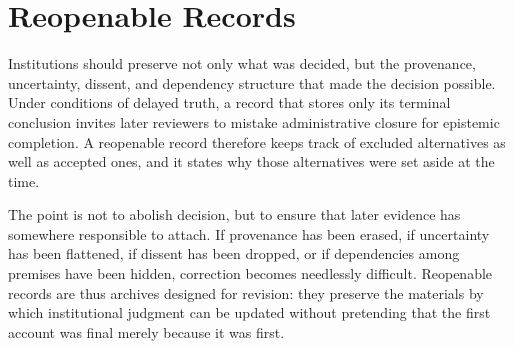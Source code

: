 
\chapter{Reopenable Records}
\label{ch:ch097}

Institutions should preserve not only what was decided, but the provenance, uncertainty, dissent, and dependency structure that made the decision possible. Under conditions of delayed truth, a record that stores only its terminal conclusion invites later reviewers to mistake administrative closure for epistemic completion. A reopenable record therefore keeps track of excluded alternatives as well as accepted ones, and it states why those alternatives were set aside at the time.

The point is not to abolish decision, but to ensure that later evidence has somewhere responsible to attach. If provenance has been erased, if uncertainty has been flattened, if dissent has been dropped, or if dependencies among premises have been hidden, correction becomes needlessly difficult. Reopenable records are thus archives designed for revision: they preserve the materials by which institutional judgment can be updated without pretending that the first account was final merely because it was first.
